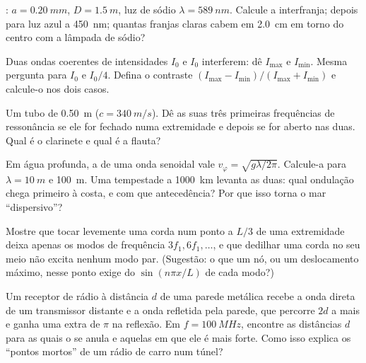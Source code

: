 \begin{exercise}[$\star\star$]\label{exo:b1:wave-propagation:7}
: $a = \qty{0.20}{mm}$, $D = \qty{1.5}{m}$, luz de sódio
$\lambda = \qty{589}{nm}$. Calcule a interfranja; depois para luz
azul a \qty{450}{nm}; quantas franjas claras cabem em \qty{2.0}{cm}
em torno do centro com a lâmpada de sódio?
\end{exercise}

\begin{exercise}[$\star\star$]\label{exo:b1:wave-propagation:8}
Duas ondas coerentes de intensidades $I_0$ e $I_0$ interferem: dê
$I_{\max}$ e $I_{\min}$. Mesma pergunta para $I_0$ e $I_0/4$. Defina
o contraste $(I_{\max} - I_{\min})/(I_{\max} + I_{\min})$ e calcule-o
nos dois casos.
\end{exercise}

\begin{exercise}[$\star\star$]\label{exo:b1:wave-propagation:9}
Um tubo de \qty{0.50}{m} ($c = \qty{340}{m/s}$). Dê as suas três primeiras
frequências de ressonância se ele for fechado numa extremidade e depois se for aberto nas
duas. Qual é o clarinete e qual é a flauta?
\end{exercise}

\begin{exercise}[$\star\star\star$]\label{exo:b1:wave-propagation:10}
Em água profunda, a  de uma onda senoidal vale
$v_\varphi = \sqrt{g\lambda/2\pi}$. Calcule-a para $\lambda = \qty{10}{m}$
e \qty{100}{m}. Uma tempestade a \qty{1000}{km} levanta as duas: qual ondulação
chega primeiro à costa, e com que antecedência? Por que isso torna o mar
``dispersivo''?
\end{exercise}

\begin{exercise}[$\star\star\star$]\label{exo:b1:wave-propagation:11}
Mostre que tocar levemente uma corda num ponto a $L/3$ de uma extremidade
deixa apenas os modos de frequência $3f_1, 6f_1, \dots$, e que
dedilhar uma corda no seu meio não excita nenhum modo par. (Sugestão: o que
um nó, ou um deslocamento máximo, nesse ponto exige do
$\sin(n\pi x/L)$ de cada modo?)
\end{exercise}

\begin{exercise}[$\star\star\star$]\label{exo:b1:wave-propagation:12}
Um receptor de rádio à distância $d$ de uma parede metálica recebe a
onda direta de um transmissor distante e a onda refletida pela
parede, que percorre $2d$ a mais e ganha uma  extra de $\pi$ na
reflexão. Em $f = \qty{100}{MHz}$, encontre as distâncias $d$ para as quais
o  se anula e aquelas em que ele é mais forte. Como isso
explica os ``pontos mortos'' de um rádio de carro num túnel?
\end{exercise}

